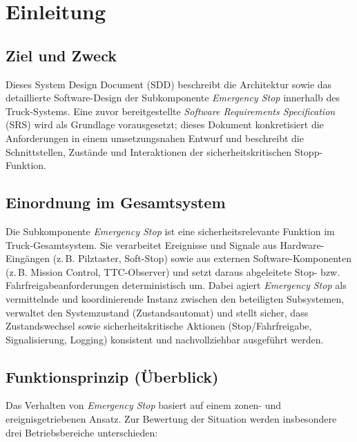 \section{Einleitung}

\subsection{Ziel und Zweck}
Dieses System Design Document (SDD) beschreibt die Architektur sowie das detaillierte Software-Design der Subkomponente
\emph{Emergency Stop} innerhalb des Truck-Systems. Eine zuvor bereitgestellte \emph{Software Requirements Specification} (SRS) wird als
Grundlage vorausgesetzt; dieses Dokument konkretisiert die Anforderungen in einem umsetzungsnahen Entwurf und beschreibt die
Schnittstellen, Zustände und Interaktionen der sicherheitskritischen Stopp-Funktion.

\subsection{Einordnung im Gesamtsystem}
Die Subkomponente \emph{Emergency Stop} ist eine sicherheitsrelevante Funktion im Truck-Gesamtsystem. Sie verarbeitet Ereignisse
und Signale aus Hardware-Eingängen (z.\,B. Pilztaster, Soft-Stop) sowie aus externen Software-Komponenten
(z.\,B. Mission Control, TTC-Observer) und setzt daraus abgeleitete Stop- bzw. Fahrfreigabeanforderungen deterministisch um.
Dabei agiert \emph{Emergency Stop} als vermittelnde und koordinierende Instanz zwischen den beteiligten Subsystemen,
verwaltet den Systemzustand (Zustandsautomat) und stellt sicher, dass Zustandswechsel sowie sicherheitskritische Aktionen
(Stop/Fahrfreigabe, Signalisierung, Logging) konsistent und nachvollziehbar ausgeführt werden.

\subsection{Funktionsprinzip (Überblick)}
Das Verhalten von \emph{Emergency Stop} basiert auf einem zonen- und ereignisgetriebenen Ansatz. Zur Bewertung der Situation
werden insbesondere drei Betriebsbereiche unterschieden:

